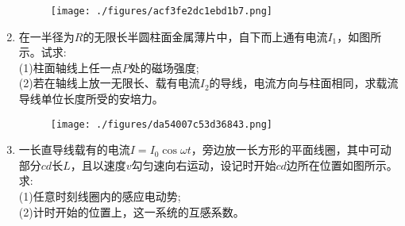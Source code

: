\begin{enumerate}
\begin{figure}[ht]
\centering
\texttt{[image: ./figures/acf3fe2dc1ebd1b7.png]}
\caption{} \label{fig_XD12_3}
\end{figure}
\item 在一半径为$R$的无限长半圆柱面金属薄片中，自下而上通有电流$I_1$，如图所示。试求:\\
(1)柱面轴线上任一点$P$处的磁场强度;\\
(2)若在轴线上放一无限长、载有电流$I_2$的导线，电流方向与柱面相同，求载流导线单位长度所受的安培力。
\begin{figure}[ht]
\centering
\texttt{[image: ./figures/da54007c53d36843.png]}
\caption{} \label{fig_XD12_4}
\end{figure}
\item 一长直导线载有的电流$I=I_0\cos \omega t$，旁边放一长方形的平面线圈，其中可动部分$cd$长$L$，且以速度$v$勾匀速向右运动，设记时开始$cd$边所在位置如图所示。求:\\
(1)任意时刻线圈内的感应电动势;\\
(2)计时开始的位置上，这一系统的互感系数。
\end{enumerate}
